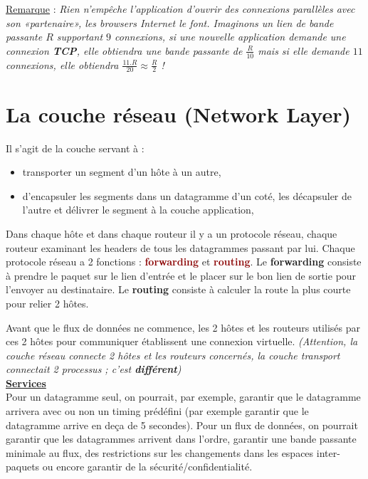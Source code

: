 \documentclass{article}
\newcommand{\dred}[1]{\textcolor{darkred}{\textbf{#1}}}
\begin{document}
\underline{Remarque} : \textit{Rien n'empêche l'application d'ouvrir des connexions parallèles avec son 
«partenaire», les browsers Internet le font. Imaginons un lien de bande passante $R$ supportant $9$ connexions,
si une nouvelle application demande une connexion \textbf{TCP}, elle obtiendra une bande passante de $\frac{R}
{10}$ mais si elle demande $11$ connexions, elle obtiendra $\frac{11.R}{20} \approx \frac{R}{2}$ !} \\

\hbox{\raisebox{0.4em}{\vrule depth 0.4pt height 0.4pt width 10cm}}

\section{La couche réseau (Network Layer)}

Il s'agit de la couche servant à :
\begin{itemize}
\item transporter un segment d'un hôte à un autre,
\item d'encapsuler les segments dans un datagramme d'un coté, les décapsuler de l'autre et délivrer le segment à 
la couche application,
\end{itemize}
Dans chaque hôte et dans chaque routeur il y a un protocole réseau, chaque routeur examinant les headers de 
tous les datagrammes passant par lui. Chaque protocole réseau a 2 fonctions : \dred{forwarding} et 
\dred{routing}. Le \textbf{forwarding} consiste à prendre le paquet sur le lien d'entrée et le placer sur le bon
lien de sortie pour l'envoyer au destinataire. Le \textbf{routing} consiste à calculer la route la plus courte 
pour relier 2 hôtes.

Avant que le flux de données ne commence, les 2 hôtes et les routeurs utilisés par ces 2 hôtes pour communiquer
établissent une connexion virtuelle. \textit{(Attention, la couche réseau connecte 2 hôtes et les routeurs 
concernés, la couche transport connectait 2 processus ; c'est \textbf{différent})} \\

\textbf{\underline{Services}} \\

Pour un datagramme seul, on pourrait, par exemple, garantir que le datagramme arrivera avec ou non un timing 
prédéfini (par exemple garantir que le datagramme arrive en deça de 5 secondes). 
Pour un flux de données, on pourrait garantir que les datagrammes arrivent dans l'ordre, garantir une bande 
passante minimale au flux, des restrictions sur les changements dans les espaces inter-paquets ou encore 
garantir de la sécurité/confidentialité.
\end{document}
